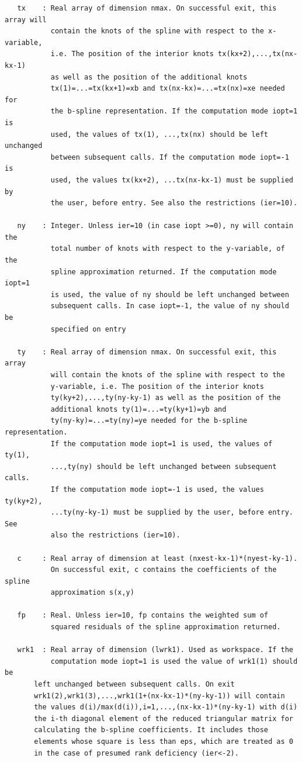 \documentclass[11pt,twoside]{article}
\begin{document}
\begin{verbatim}
   tx    : Real array of dimension nmax. On successful exit, this array will 
           contain the knots of the spline with respect to the x-variable,
           i.e. The position of the interior knots tx(kx+2),...,tx(nx-kx-1) 
           as well as the position of the additional knots
           tx(1)=...=tx(kx+1)=xb and tx(nx-kx)=...=tx(nx)=xe needed for
           the b-spline representation. If the computation mode iopt=1 is
           used, the values of tx(1), ...,tx(nx) should be left unchanged
           between subsequent calls. If the computation mode iopt=-1 is
           used, the values tx(kx+2), ...tx(nx-kx-1) must be supplied by
           the user, before entry. See also the restrictions (ier=10).

   ny    : Integer. Unless ier=10 (in case iopt >=0), ny will contain the 
           total number of knots with respect to the y-variable, of the
           spline approximation returned. If the computation mode iopt=1
           is used, the value of ny should be left unchanged between
           subsequent calls. In case iopt=-1, the value of ny should be
           specified on entry

   ty    : Real array of dimension nmax. On successful exit, this array 
           will contain the knots of the spline with respect to the
           y-variable, i.e. The position of the interior knots
           ty(ky+2),...,ty(ny-ky-1) as well as the position of the
           additional knots ty(1)=...=ty(ky+1)=yb and
           ty(ny-ky)=...=ty(ny)=ye needed for the b-spline representation. 
           If the computation mode iopt=1 is used, the values of ty(1),
           ...,ty(ny) should be left unchanged between subsequent calls.
           If the computation mode iopt=-1 is used, the values ty(ky+2),
           ...ty(ny-ky-1) must be supplied by the user, before entry. See
           also the restrictions (ier=10).

   c     : Real array of dimension at least (nxest-kx-1)*(nyest-ky-1).
           On successful exit, c contains the coefficients of the spline
           approximation s(x,y)

   fp    : Real. Unless ier=10, fp contains the weighted sum of
           squared residuals of the spline approximation returned.

   wrk1  : Real array of dimension (lwrk1). Used as workspace. If the 
           computation mode iopt=1 is used the value of wrk1(1) should be
 	   left unchanged between subsequent calls. On exit
 	   wrk1(2),wrk1(3),...,wrk1(1+(nx-kx-1)*(ny-ky-1)) will contain
 	   the values d(i)/max(d(i)),i=1,...,(nx-kx-1)*(ny-ky-1) with d(i)
 	   the i-th diagonal element of the reduced triangular matrix for
 	   calculating the b-spline coefficients. It includes those
 	   elements whose square is less than eps, which are treated as 0
 	   in the case of presumed rank deficiency (ier<-2).


\end{verbatim}
\end{document}
